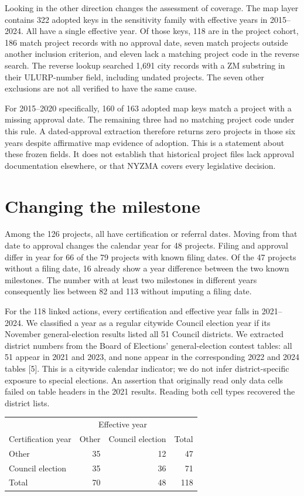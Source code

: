 \documentclass[11pt]{article}
\begin{document}
Looking in the other direction changes the assessment of coverage. The map layer contains 322 adopted keys in the sensitivity family with effective years in 2015--2024. All have a single effective year. Of those keys, 118 are in the project cohort, 186 match project records with no approval date, seven match projects outside another inclusion criterion, and eleven lack a matching project code in the reverse search. The reverse lookup searched 1,691 city records with a ZM substring in their ULURP-number field, including undated projects. The seven other exclusions are not all verified to have the same cause.

For 2015--2020 specifically, 160 of 163 adopted map keys match a project with a missing approval date. The remaining three had no matching project code under this rule. A dated-approval extraction therefore returns zero projects in those six years despite affirmative map evidence of adoption. This is a statement about these frozen fields. It does not establish that historical project files lack approval documentation elsewhere, or that NYZMA covers every legislative decision.

\section{Changing the milestone}
Among the 126 projects, all have certification or referral dates. Moving from that date to approval changes the calendar year for 48 projects. Filing and approval differ in year for 66 of the 79 projects with known filing dates. Of the 47 projects without a filing date, 16 already show a year difference between the two known milestones. The number with at least two milestones in different years consequently lies between 82 and 113 without imputing a filing date.

For the 118 linked actions, every certification and effective year falls in 2021--2024. We classified a year as a regular citywide Council election year if its November general-election results listed all 51 Council districts. We extracted district numbers from the Board of Elections' general-election contest tables: all 51 appear in 2021 and 2023, and none appear in the corresponding 2022 and 2024 tables [5]. This is a citywide calendar indicator; we do not infer district-specific exposure to special elections. An assertion that originally read only data cells failed on table headers in the 2021 results. Reading both cell types recovered the district lists.

\begin{center}
\begin{tabular}{lrrr}
\toprule
 & \multicolumn{2}{c}{Effective year} &\\
Certification year & Other & Council election & Total\\
\midrule
Other &35&12&47\\
Council election &35&36&71\\
\midrule
Total &70&48&118\\
\bottomrule
\end{tabular}
\end{center}
\end{document}
